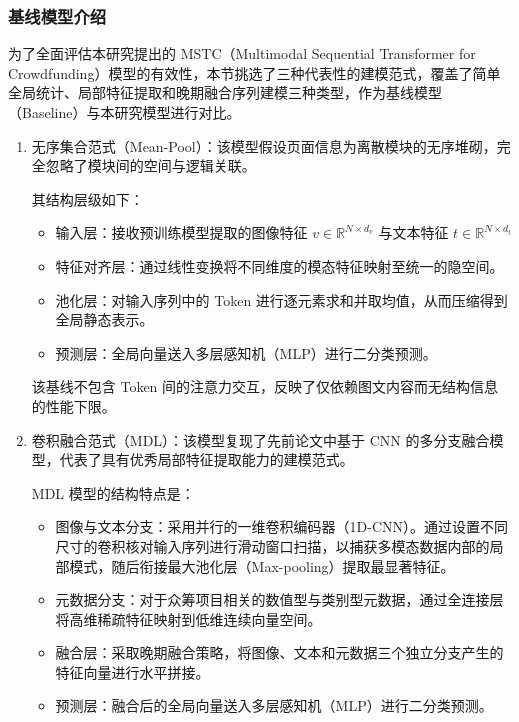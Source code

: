 \subsubsection{基线模型介绍}
为了全面评估本研究提出的 MSTC（Multimodal Sequential Transformer for Crowdfunding）模型的有效性，本节挑选了三种代表性的建模范式，覆盖了简单全局统计、局部特征提取和晚期融合序列建模三种类型，作为基线模型（Baseline）与本研究模型进行对比。

\begin{enumerate}[label=(\arabic*)]
  \item 无序集合范式（Mean-Pool）：该模型假设页面信息为离散模块的无序堆砌，完全忽略了模块间的空间与逻辑关联。

其结构层级如下：

\begin{itemize}
  \item 输入层：接收预训练模型提取的图像特征 $ v \in \mathbb{R}^{N \times d_v} $ 与文本特征 $ t \in \mathbb{R}^{N \times d_t} $
  \item 特征对齐层：通过线性变换将不同维度的模态特征映射至统一的隐空间。
  \item 池化层：对输入序列中的 Token 进行逐元素求和并取均值，从而压缩得到全局静态表示。
  \item 预测层：全局向量送入多层感知机（MLP）进行二分类预测。
\end{itemize}

该基线不包含 Token 间的注意力交互，反映了仅依赖图文内容而无结构信息的性能下限。

  \item 卷积融合范式（MDL）：该模型复现了先前论文中基于 CNN 的多分支融合模型，代表了具有优秀局部特征提取能力的建模范式。

MDL 模型的结构特点是：

\begin{itemize}
  \item 图像与文本分支：采用并行的一维卷积编码器（1D-CNN）。通过设置不同尺寸的卷积核对输入序列进行滑动窗口扫描，以捕获多模态数据内部的局部模式，随后衔接最大池化层（Max-pooling）提取最显著特征。
  \item 元数据分支：对于众筹项目相关的数值型与类别型元数据，通过全连接层将高维稀疏特征映射到低维连续向量空间。
  \item 融合层：采取晚期融合策略，将图像、文本和元数据三个独立分支产生的特征向量进行水平拼接。
  \item 预测层：融合后的全局向量送入多层感知机（MLP）进行二分类预测。
\end{itemize}


\end{enumerate}
